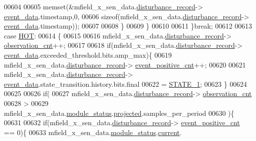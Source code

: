 \begin{DoxyCode}
00604 
00605                              memset(&mfield\_x\_sen\_data.\hyperlink{a00025_ac9b38e2c1d3f1013a88d33506c754152}{disturbance\_record}->
      \hyperlink{a00028_a8c0bda69e71ef674e60da47ad0be9ab0}{event\_data}.timestamp,0,
00606                                      \textcolor{keyword}{sizeof}(mfield\_x\_sen\_data.\hyperlink{a00025_ac9b38e2c1d3f1013a88d33506c754152}{disturbance\_record}->
      \hyperlink{a00028_a8c0bda69e71ef674e60da47ad0be9ab0}{event\_data}.timestamp));
00607 
00608                          \}
00609              \}
00610 
00611         \}\textcolor{keywordflow}{break};
00612 
00613         \textcolor{keywordflow}{case} \hyperlink{a00021_a1eb14cc432874ddacd1934791dbe12a3}{HOT}:
00614         \{
00615 
00616              mfield\_x\_sen\_data.\hyperlink{a00025_ac9b38e2c1d3f1013a88d33506c754152}{disturbance\_record}->
      \hyperlink{a00028_ad5b0bac02ce266b91b2b52a1c3ea1d78}{observation\_cnt}++;
00617 
00618             \textcolor{keywordflow}{if}(mfield\_x\_sen\_data.\hyperlink{a00025_ac9b38e2c1d3f1013a88d33506c754152}{disturbance\_record}->
      \hyperlink{a00028_a8c0bda69e71ef674e60da47ad0be9ab0}{event\_data}.exceeded\_threshold.bits.amp\_max)\{
00619                  mfield\_x\_sen\_data.\hyperlink{a00025_ac9b38e2c1d3f1013a88d33506c754152}{disturbance\_record}->
      \hyperlink{a00028_a7397b9d76d4b57500f27bb23d258a18a}{event\_positive\_cnt}++;
00620 
00621                 mfield\_x\_sen\_data.\hyperlink{a00025_ac9b38e2c1d3f1013a88d33506c754152}{disturbance\_record}->
      \hyperlink{a00028_a8c0bda69e71ef674e60da47ad0be9ab0}{event\_data}.state\_transition.history.bits.final
00622                 = \hyperlink{a00021_a727351838367f27ac0adb9a13422c342}{STATE\_1};
00623             \}
00624 
00625 
00626              \textcolor{keywordflow}{if}(
00627                   mfield\_x\_sen\_data.\hyperlink{a00025_ac9b38e2c1d3f1013a88d33506c754152}{disturbance\_record}->
      \hyperlink{a00028_ad5b0bac02ce266b91b2b52a1c3ea1d78}{observation\_cnt}
00628                   >
00629                   mfield\_x\_sen\_data.\hyperlink{a00025_adfab5a5d8b45a93dfb13edb24e2b80e3}{module\_status}.\hyperlink{a00019_af2267fb093fb5dcaa006a570a6da3b6b}{projected}.samples\_per\_period
00630                )\{
00631 
00632                  \textcolor{keywordflow}{if}(mfield\_x\_sen\_data.\hyperlink{a00025_ac9b38e2c1d3f1013a88d33506c754152}{disturbance\_record}->
      \hyperlink{a00028_a7397b9d76d4b57500f27bb23d258a18a}{event\_positive\_cnt} == 0)\{
00633                      mfield\_x\_sen\_data.\hyperlink{a00025_adfab5a5d8b45a93dfb13edb24e2b80e3}{module\_status}.\hyperlink{a00019_acf41ffc11da291c2f9f0fcb02ee72b98}{current}.

\end{DoxyCode}
